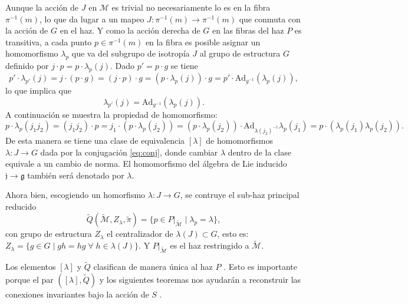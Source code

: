 Aunque la acci\'{o}n de $J$ en $\mathcal{M}$ es trivial no necesariamente lo es en la fibra $\pi^{-1} (m)$, lo que da lugar a un mapeo $J: \pi^{-1} (m) \longrightarrow \pi^{-1} (m)$ que conmuta con la acci\'{o}n de $G$ en el haz. Y como la acci\'{o}n derecha de $G$ en las fibras del haz $P$ es transitiva, a cada punto $p \in \pi^{-1}(m)$ en la fibra es posible asignar un homomorfismo $\lambda_{p}$ que va del subgrupo de isotrop\'{i}a $J$ al grupo de estructura $G$ definido por $j \cdot p = p \cdot \lambda_{p} (j)$. Dado $p' = p \cdot g$ se tiene
%
\begin{equation*}
p' \cdot \lambda_{p'} (j) = j \cdot (p \cdot g) = (j \cdot p) \cdot g = (p \cdot \lambda_{p} (j)) \cdot g = p' \cdot \mathrm{Ad}_{g^{-1}} (\lambda_{p} (j)),
\end{equation*}
%
lo que implica que
%
\begin{equation}
\label{eq:conj}
\lambda_{p'} (j) = \mathrm{Ad}_{g^{-1}} (\lambda_{p} (j)).
\end{equation}
%
A continuaci\'{o}n se muestra la propiedad de homomorfismo:
%
\begin{equation*}
p \cdot \lambda_{p} (j_{1} j_{2}) = (j_{1} j_{2}) \cdot p = j_{1} \cdot (p \cdot \lambda_{p} (j_{2})) = (p \cdot \lambda_{p} (j_{2})) \cdot \mathrm{Ad}_{\lambda(j_{2})^{-1}} \lambda_{p} (j_{1}) = p \cdot (\lambda_{p} (j_{1}) \lambda_{p} (j_{2})).
\end{equation*}
%
De esta manera se tiene una clase de equivalencia $[\lambda]$ de homomorfismos $\lambda: J \longrightarrow G$ dada por la conjugaci\'{o}n \eqref{eq:conj}, donde cambiar $\lambda$ dentro de la clase equivale a un cambio de norma. El homomorfismo del \'{a}lgebra de Lie inducido $\mathfrak{j} \longrightarrow \mathfrak{g}$ tambi\'{e}n ser\'{a} denotado por $\lambda$.

Ahora bien, escogiendo un homorfismo $\lambda: J \longrightarrow G$, se contruye el sub-haz principal reducido $$\tilde{Q}(\tilde{\mathcal{M}}, Z_{\lambda}, \tilde{\pi}) = \{p \in P \vert_{\tilde{\mathcal{M}}} \; \vert \; \lambda_{p} = \lambda\},$$ con grupo de estructura $Z_{\lambda}$ el centralizador de $\lambda(J) \subset G$, esto es: $Z_{\lambda} = \{g \in G \; \vert \; gh = hg \; \forall \; h \in \lambda(J)\}.$ Y $P \vert_{\tilde{\mathcal{M}}}$ es el haz restringido a $\tilde{\mathcal{M}}$.

Los elementos $[\lambda]$ y $\tilde{Q}$ clasifican de manera \'{u}nica al haz $P$ \cite{Brodbeck}. Esto es importante porque el par $([\lambda], \tilde{Q})$ y los siguientes teoremas \cite{Kobayashi} nos ayudar\'{a}n a reconstruir las conexiones invariantes bajo la acci\'{o}n de $S$ \cite{Bojowald2005}.

